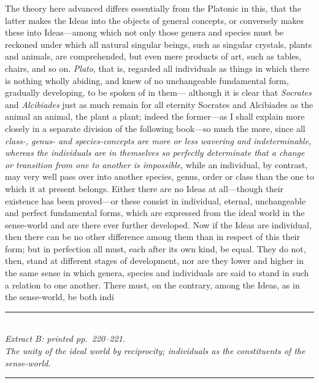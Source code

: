 \documentclass[12pt,a4paper]{article}
\newcommand{\spanhead}[1]{%
  \bigskip\begin{center}\rule{0.18\linewidth}{0.4pt}\\[6pt]
  {\small\itshape #1}\\[4pt]\rule{0.18\linewidth}{0.4pt}\end{center}\smallskip}
\begin{document}
The theory here advanced differs essentially from the Platonic in this, that the
latter makes the Ideas into the objects of general concepts, or conversely makes
these into Ideas---among which not only those genera and species must be reckoned
under which all natural singular beings, such as singular crystals, plants and
animals, are comprehended, but even mere products of art, such as tables, chairs,
and so on. \emph{Plato}, that is, regarded all
individuals as things in which there is nothing wholly abiding, and knew of no
unchangeable fundamental form, gradually developing, to be spoken of in them---
although it is clear that \emph{Socrates} and \emph{Alcibiades} just as much remain
for all eternity Socrates and Alcibiades as the animal an animal, the plant a
plant; indeed the former---as I shall explain more closely in a separate division
of the following book---so much the more, since all \emph{class-, genus- and
species-concepts are more or less wavering and indeterminable, whereas the
individuals are in themselves so perfectly determinate that a change or transition
from one to another is impossible}, while an individual, by contrast, may very well
pass over into another species, genus, order or class than the one to which it at
present belongs. Either there are no Ideas at all---though their existence has been
proved---or these consist in individual, eternal, unchangeable and perfect
fundamental forms, which are expressed from the ideal world in the sense-world and
are there ever further developed. Now if the Ideas are individual, then there can
be no other difference among them than in respect of this their form; but in
perfection all must, each after its own kind, be equal. They do not, then, stand
at different stages of development, nor are they lower and higher in the same sense
in which genera, species and individuals are said to stand in such a relation to
one another. There must, on the contrary, among the Ideas, as in the sense-world,
be both indi

\spanhead{Extract B: printed pp.\ 220--221.\\
  The unity of the ideal world by reciprocity; individuals as the constituents
  of the sense-world.}
\end{document}
